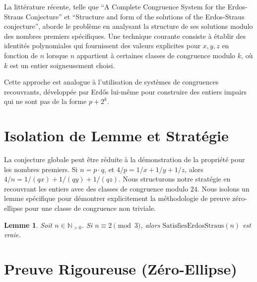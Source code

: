 \documentclass[12pt, a4paper]{article}
\newtheorem{lemma}[theorem]{Lemme}
\begin{document}
La litt\'erature r\'ecente, telle que ``A Complete Congruence System for the Erdos-Straus Conjecture'' et ``Structure and form of the solutions of the Erdos-Straus conjecture'', aborde le probl\`eme en analysant la structure de ses solutions modulo des nombres premiers sp\'ecifiques. Une technique courante consiste \`a \'etablir des identit\'es polynomiales qui fournissent des valeurs explicites pour $x, y, z$ en fonction de $n$ lorsque $n$ appartient \`a certaines classes de congruence modulo $k$, o\`u $k$ est un entier soigneusement choisi.

Cette approche est analogue \`a l'utilisation de syst\`emes de congruences recouvrants, d\'evelopp\'ee par Erd\H{o}s lui-m\^eme pour construire des entiers impairs qui ne sont pas de la forme $p + 2^k$.

\section{Isolation de Lemme et Strat\'egie}

La conjecture globale peut \^etre r\'eduite \`a la d\'emonstration de la propri\'et\'e pour les nombres premiers.
Si $n = p \cdot q$, et $4/p = 1/x + 1/y + 1/z$, alors $4/n = 1/(qx) + 1/(qy) + 1/(qz)$.
Nous structurons notre strat\'egie en recouvrant les entiers avec des classes de congruence modulo $24$.
Nous isolons un lemme sp\'ecifique pour d\'emontrer explicitement la m\'ethodologie de preuve z\'ero-ellipse pour une classe de congruence non triviale.

\begin{lemma}
Soit $n \in \mathbb{N}_{>0}$. Si $n \equiv 2 \pmod 3$, alors $\text{SatisfiesErdosStraus}(n)$ est vraie.
\end{lemma}

\section{Preuve Rigoureuse (Z\'ero-Ellipse)}
\end{document}
